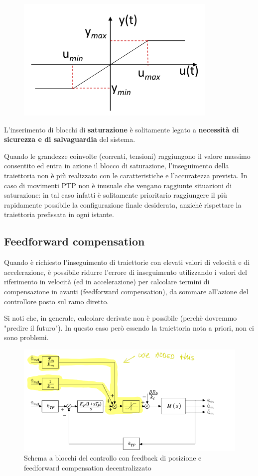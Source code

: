 \begin{figure}[H]
	\centering
	\includegraphics[width=0.4\linewidth]{images/saturation}
	\label{fig:saturation}
\end{figure}


L’inserimento di blocchi di \textbf{saturazione} è solitamente legato a \textbf{necessità di sicurezza e di salvaguardia} del sistema.

Quando le grandezze coinvolte (correnti, tensioni) raggiungono il valore massimo consentito ed entra in azione il blocco di saturazione, l’inseguimento della traiettoria non è più realizzato con le caratteristiche e l’accuratezza prevista. In caso di movimenti PTP non è inusuale che vengano raggiunte situazioni di saturazione: in tal caso infatti è solitamente prioritario raggiungere il più rapidamente possibile la configurazione finale desiderata, anziché rispettare la traiettoria prefissata in ogni istante.







\subsection{Feedforward compensation}
Quando è richiesto l’inseguimento di traiettorie con elevati valori di velocità e di accelerazione, è possibile ridurre l’errore di inseguimento utilizzando i valori del riferimento in velocità (ed in accelerazione) per calcolare termini di compensazione in avanti (feedforward compensation), da sommare all’azione del controllore posto sul ramo diretto.

Si noti che, in generale, calcolare derivate non è possibile (perchè dovremmo "predire il futuro"). In questo caso però essendo la traiettoria nota a priori, non ci sono problemi.

\begin{figure}[H]
	\centering
	\includegraphics[width=0.7\linewidth]{images/feedforward_compensation}
	\caption{Schema a blocchi del controllo con feedback di posizione e feedforward compensation decentralizzato}
	\label{fig:feedforwardcompensation}
\end{figure}





